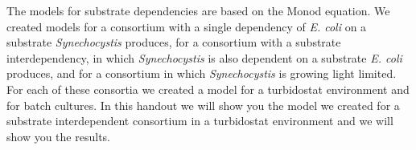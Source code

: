 \documentclass[12pt]{report}
\begin{document}



The models for substrate dependencies are based on the Monod equation. We created models for a consortium with a single dependency of \textit{E. coli} on a substrate \textit{Synechocystis} produces, for a consortium with a substrate interdependency, in which \textit{Synechocystis} is also dependent on a substrate \textit{E. coli} produces, and for a consortium in which \textit{Synechocystis} is growing light limited. For each of these consortia we created a model for a turbidostat environment and for batch cultures. In this handout we will show you the model we created for a substrate interdependent consortium in a turbidostat environment and we will show you the results.
\end{document}
